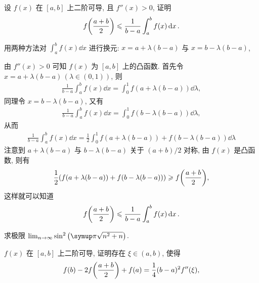 \begin{exercise}[series=exer]
\begin{exercise}
    \end{exercise}
    \item 设 $ f(x) $ 在 $ [a, b] $ 上二阶可导, 且 $ f''(x) > 0 $, 证明
    \begin{align*}
        f\qty(\frac{a + b}{2}) \leqslant \frac{1}{b - a} \int_{a}^{b} f(x) \dd{x}.
    \end{align*}
    \begin{hint}
        用两种方法对 $ \int_{a}^{b} f(x) \dd{x} $ 进行换元: $ x = a + \lambda(b - a) $ 与 $ x = b - \lambda(b - a) $, 
    \end{hint}
    \begin{answer}
        由 $ f''(x) > 0 $ 可知 $ f(x) $ 为 $ [a, b] $ 上的凸函数. 首先令 $ x = a + \lambda(b - a)\,(\lambda \in (0, 1)) $, 则
        \begin{align*}
            \frac{1}{b - a}\int_{a}^{b} f(x) \dd{x} = \int_{0}^{1} f(a + \lambda(b - a)) \dd{\lambda},
        \end{align*}
        同理令 $ x = b - \lambda(b - a) $, 又有
        \begin{align*}
            \frac{1}{b - a}\int_{a}^{b} f(x) \dd{x} = \int_{0}^{1} f(b - \lambda(b - a)) \dd{\lambda},
        \end{align*}
        从而
        \begin{align*}
            \frac{1}{b - a}\int_{a}^{b} f(x) \dd{x} = \frac{1}{2} \int_{0}^{1} f(a + \lambda(b - a)) + f(b - \lambda(b - a)) \dd{\lambda}
        \end{align*}
        注意到 $ a + \lambda(b - a) $ 与 $ b - \lambda(b - a) $ 关于 $ (a + b)/2 $ 对称, 由 $ f(x) $ 是凸函数, 则有
        \begin{align*}
            \frac{1}{2}(f(a + \lambda(b - a)) + f(b - \lambda(b - a))) \geqslant f\qty(\frac{a + b}{2}), 
        \end{align*}
        这样就可以知道
        \begin{align*}
            f\qty(\frac{a + b}{2}) \leqslant \frac{1}{b - a} \int_{a}^{b} f(x) \dd{x}.
        \end{align*}
    \end{answer}
    \item 求极限 $ \limit{n}{\infty} \sin^{2}\qty(\pi \sqrt{n^{2} + n}) $.  
    \item $ f(x) $ 在 $ [a, b] $ 上二阶可导, 证明存在 $ \xi \in (a, b) $, 使得
    \begin{align*}
        f(b) - 2f\qty(\frac{a + b}{2}) + f(a) = \frac{1}{4} (b - a)^{2} f''(\xi),
    \end{align*}

\end{exercise}
